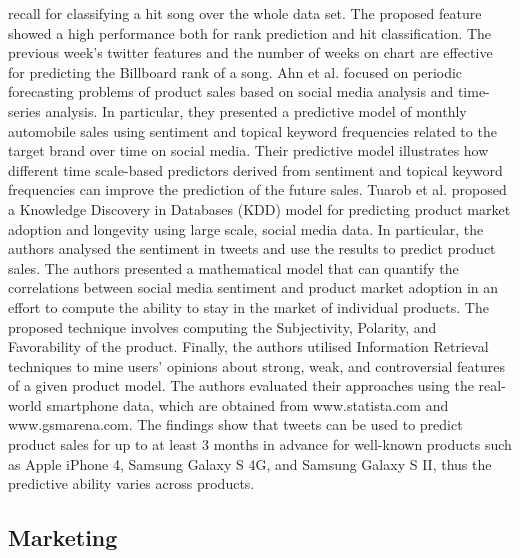 \documentclass[]{book}
\begin{document}
recall for classifying a hit song over the whole data set. The proposed
feature showed a high performance both for rank prediction and hit
classification. The previous week's twitter features and the number of
weeks on chart are effective for predicting the Billboard rank of a
song. Ahn et al. \citep{ahn2014sales} focused on periodic forecasting
problems of product sales based on social media analysis and time-series
analysis. In particular, they presented a predictive model of monthly
automobile sales using sentiment and topical keyword frequencies related
to the target brand over time on social media. Their predictive model
illustrates how different time scale-based predictors derived from
sentiment and topical keyword frequencies can improve the prediction of
the future sales. Tuarob et al. \citep{tuarob2013fad} proposed a
Knowledge Discovery in Databases (KDD) model for predicting product
market adoption and longevity using large scale, social media data. In
particular, the authors analysed the sentiment in tweets and use the
results to predict product sales. The authors presented a mathematical
model that can quantify the correlations between social media sentiment
and product market adoption in an effort to compute the ability to stay
in the market of individual products. The proposed technique involves
computing the Subjectivity, Polarity, and Favorability of the product.
Finally, the authors utilised Information Retrieval techniques to mine
users' opinions about strong, weak, and controversial features of a
given product model. The authors evaluated their approaches using the
real-world smartphone data, which are obtained from www.statista.com and
www.gsmarena.com. The findings show that tweets can be used to predict
product sales for up to at least 3 months in advance for well-known
products such as Apple iPhone 4, Samsung Galaxy S 4G, and Samsung Galaxy
S II, thus the predictive ability varies across products.

\subsection{Marketing}\label{marketing}
\end{document}
